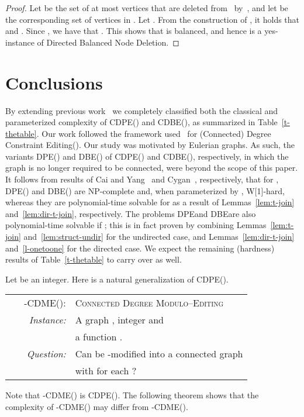 \documentclass[11pt]{llncs}
\newcommand{\cdpe}{{\sc CDPE}}
\newcommand{\dpe}{{\sc DPE}}
\newcommand{\cdbe}{{\sc CDBE}}
\newcommand{\dbe}{{\sc DBE}}
\newcommand{\NP}{{\sf NP}}
\newcommand{\W}{{\sf W[1]}}
\begin{document}
\begin{proof}
Let  be the set of at most  vertices that are deleted
from~ by~, and let  be the corresponding
set of vertices in . Let . From the construction of
, it holds that 
 and
.  Since
, we have that .
This shows that  is balanced, and hence  is a yes-instance of {\sc
Directed Balanced Node Deletion}.
\end{proof}


\section{Conclusions}\label{sec:concl}

By extending previous work~\cite{BoeschST77,CaiY11,CyganMPPS14} we completely
classified both the classical and parameterized complexity of \cdpe() and
\cdbe(), as summarized in Table~\ref{t-thetable}.  Our work followed the
framework used~\cite{Golovach13,MathiesonS12} for  {\sc (Connected) Degree
Constraint Editing()}. 
Our study was motivated by Eulerian graphs. As such,
the variants \dpe() and \dbe() of \cdpe() and \cdbe(),
respectively, in which the graph  is no longer required to be connected,
were beyond the scope of this paper.  It follows from results of Cai and
Yang~\cite{CaiY11} and Cygan~\cite{CyganMPPS14}, respectively, that for
, \dpe() and  \dbe() are \NP-complete and, when parameterized
by , \W-hard, whereas they are polynomial-time solvable for 
as a result of Lemmas~\ref{lem:t-join} and~\ref{lem:dir-t-join}, respectively.
The problems \dpe and \dbe are also polynomial-time solvable if
; this is in fact proven by combining
Lemmas~\ref{lem:t-join} and~\ref{lem:struct-undir} for the undirected case, and
Lemmas~\ref{lem:dir-t-join} and~\ref{l-onetoone} for the directed case.  We
expect the remaining (hardness) results of Table~\ref{t-thetable} to carry over
as well.

Let  be an integer. Here is a natural generalization of \cdpe().

\begin{center}
\begin{boxedminipage}{.99\textwidth}
\begin{tabular}{rl}
\textsc{-CDME():} & \textsc{Connected Degree Modulo--Editing}\\
\textit{~~~~Instance:} & A graph , integer  and\\ & 
                        a function
                        .\\
\textit{Question:} & Can  be -modified into a connected graph \\& with 
          for each ?
                   \end{tabular}
\end{boxedminipage}
\end{center}
Note that -\textsc{CDME}() is \cdpe().  
The following theorem shows
that the complexity of -\textsc{CDME}() may differ from
-\textsc{CDME}().
\end{document}
